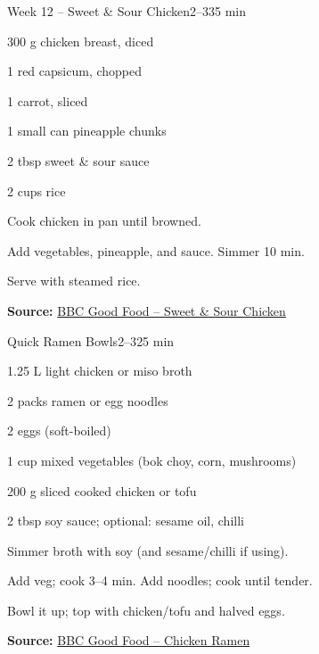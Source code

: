 \begin{recipebox}{Week 12 – Sweet \& Sour Chicken}{2--3}{35 min}
\begin{ingredients}
  \item 300 g chicken breast, diced
  \item 1 red capsicum, chopped
  \item 1 carrot, sliced
  \item 1 small can pineapple chunks
  \item 2 tbsp sweet \& sour sauce
  \item 2 cups rice
\end{ingredients}

\begin{method}
  \item Cook chicken in pan until browned.
  \item Add vegetables, pineapple, and sauce. Simmer 10 min.
  \item Serve with steamed rice.
\end{method}
\textbf{Source:} \href{https://www.bbcgoodfood.com/recipes/sweet-sour-chicken}{BBC Good Food – Sweet \& Sour Chicken}
\end{recipebox}

\begin{recipebox}{Quick Ramen Bowls}{2--3}{25 min}
\begin{ingredients}
  \item 1.25 L light chicken or miso broth
  \item 2 packs ramen or egg noodles
  \item 2 eggs (soft-boiled)
  \item 1 cup mixed vegetables (bok choy, corn, mushrooms)
  \item 200 g sliced cooked chicken or tofu
  \item 2 tbsp soy sauce; optional: sesame oil, chilli
\end{ingredients}
\begin{method}
  \item Simmer broth with soy (and sesame/chilli if using).
  \item Add veg; cook 3--4 min. Add noodles; cook until tender.
  \item Bowl it up; top with chicken/tofu and halved eggs.
\end{method}
\textbf{Source:} \href{https://www.bbcgoodfood.com/recipes/chicken-ramen}{BBC Good Food – Chicken Ramen}
\end{recipebox}

